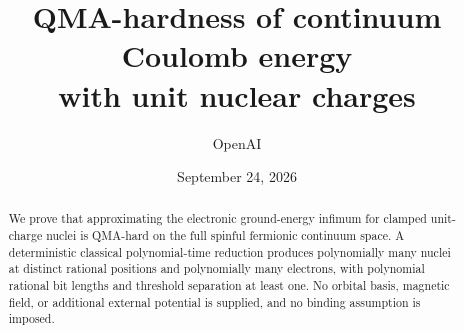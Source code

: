 \documentclass[11pt]{article}
\title{QMA-hardness of continuum Coulomb energy\\with unit nuclear charges}
\author{OpenAI}
\date{September 24, 2026}
\theoremstyle{definition}
\begin{document}
\maketitle
\begin{abstract}
We prove that approximating the electronic ground-energy infimum for
clamped unit-charge nuclei is QMA-hard on the full spinful fermionic
continuum space. A deterministic classical polynomial-time reduction
produces polynomially many nuclei at distinct rational positions and
polynomially many electrons, with polynomial rational bit lengths and
threshold separation at least one. No orbital basis, magnetic field, or
additional external potential is supplied, and no binding assumption is
imposed.
\end{abstract}










\end{document}
